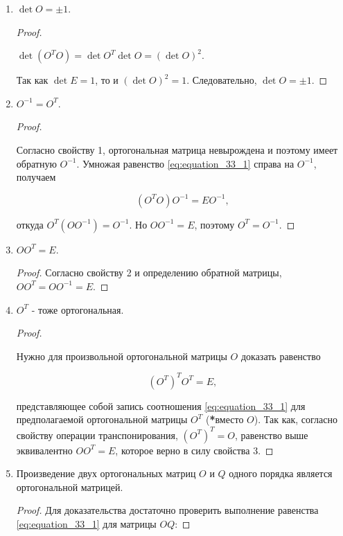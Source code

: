 \begin{enumerate}[label={\arabic*°.}]
    \item $\det O = \pm 1$.
    
    \begin{proof}~
    
        $\det(O^TO) = \det O^T \det O = (\det O)^2$.
        
        Так как $\det E = 1$, то и $(\det O)^2 = 1$. Следовательно, $\det O = \pm 1$.
    \end{proof}
    
    \item $O^{-1} = O^T$.

    \begin{proof}~
    
        Согласно свойству 1, ортогональная матрица невырождена и поэтому имеет обратную $O^{-1}$. Умножая равенство \eqref{eq:equation_33_1} справа на $O^{-1}$, получаем

        $$(O^TO)O^{-1} = EO^{-1},$$

        откуда $O^T(OO^{-1}) = O^{-1}$. Но $OO^{-1} = E$, поэтому $O^T = O^{-1}$.
    \end{proof}

    \item $OO^T = E$.

    \begin{proof}
        Согласно свойству 2 и определению обратной матрицы, $OO^T = OO^{-1} = E$.
    \end{proof}

    \item $O^T$ - тоже ортогональная.

    \begin{proof}~
    
        Нужно для произвольной ортогональной матрицы $O$ доказать равенство

        $$(O^T)^TO^T = E,$$

        представляющее собой запись соотношения \eqref{eq:equation_33_1} для предполагаемой ортогональной матрицы $O^T$ (\textbf{*}вместо $O$). Так как, согласно свойству операции транспонирования, $(O^T)^T = O$, равенство выше эквивалентно $OO^T = E$, которое верно в силу свойства 3.
    \end{proof}

    \item Произведение двух ортогональных матриц $O$ и $Q$ одного порядка является ортогональной матрицей.

    \begin{proof}
        Для доказательства достаточно проверить выполнение равенства \eqref{eq:equation_33_1} для матрицы $OQ$:


\end{proof}
\end{enumerate}
